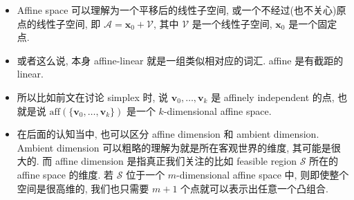 \begin{defblock}
\begin{itemize}
\item {}Affine space 可以理解为一个平移后的线性子空间, 或一个不经过(也不关心)原点的线性子空间, 即 $\mathcal{A} = \bm{x}_0 + \mathcal{V}$, 其中 $\mathcal{V}$ 是一个线性子空间, $\bm{x}_0$ 是一个固定点.


\item {}或者这么说, 本身 affine-linear 就是一组类似相对应的词汇. affine 是有截距的 linear.


\item {}所以比如前文在讨论 simplex 时, 说 $\bm{v}_0, \ldots, \bm{v}_k$ 是 affinely independent 的点, 也就是说 $\text{aff}(\{\bm{v}_0, \ldots, \bm{v}_k\})$ 是一个 $k$-dimensional affine space.


\item {}在后面的认知当中, 也可以区分 affine dimension 和 ambient dimension. Ambient dimension 可以粗略的理解为就是所在客观世界的维度, 其可能是很大的. 而 affine dimension 是指真正我们关注的比如 feasible region $\mathcal{S}$ 所在的 affine space 的维度. 若 $\mathcal{S}$ 位于一个 $m$-dimensional affine space 中, 则即使整个空间是很高维的, 我们也只需要 $m+1$ 个点就可以表示出任意一个凸组合.


\end{itemize}

\end{defblock}


